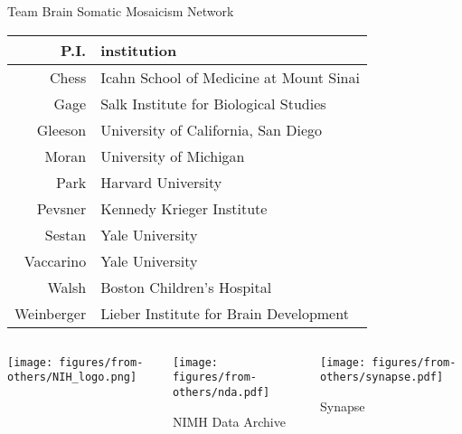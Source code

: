 \documentclass{beamer}
\begin{document}
\begin{frame}{Team}
Brain Somatic Mosaicism Network
\footnotesize
\begin{tabular}{rl}
\hline
P.I. & institution \\
\hline
\alert{Chess} & \alert{Icahn School of Medicine at Mount Sinai}\\
Gage & Salk Institute for Biological Studies\\
Gleeson & University of California, San Diego\\
Moran & University of Michigan\\
\alert{Park} & \alert{Harvard University}\\
Pevsner & Kennedy Krieger Institute\\
Sestan & Yale University\\
Vaccarino & Yale University\\
\alert{Walsh} & \alert{Boston Children's Hospital}\\
Weinberger & Lieber Institute for Brain Development\\
\end{tabular}
\vfill
\begin{columns}[t]
\begin{column}{0.3\textwidth}
\begin{center}

\texttt{[image: figures/from-others/NIH\_logo.png]}
\end{center}
\end{column}

\begin{column}{0.3\textwidth}
\begin{center}

\texttt{[image: figures/from-others/nda.pdf]}

NIMH Data Archive
\end{center}
\end{column}

\begin{column}{0.3\textwidth}
\begin{center}

\texttt{[image: figures/from-others/synapse.pdf]}

Synapse
\end{center}
\end{column}
\end{columns}
\end{frame}
\end{document}
